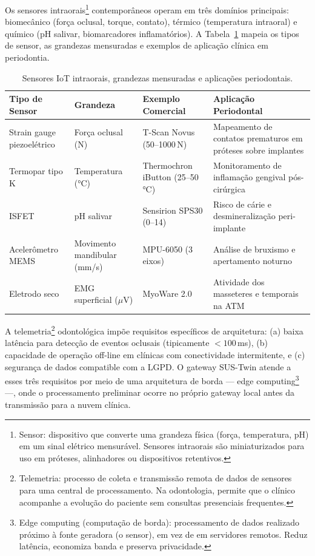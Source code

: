 Os sensores intraorais\footnote{Sensor: dispositivo que converte uma grandeza física (força, temperatura, pH) em um sinal elétrico mensurável. Sensores intraorais são miniaturizados para uso em próteses, alinhadores ou dispositivos retentivos.} contemporâneos operam em três domínios principais: biomecânico (força oclusal, torque, contato), térmico (temperatura intraoral) e químico (pH salivar, biomarcadores inflamatórios). A Tabela~\ref{tab:sensores-grandezas} mapeia os tipos de sensor, as grandezas mensuradas e exemplos de aplicação clínica em periodontia.

\begin{table}[hbt!]
\centering
\caption{Sensores IoT intraorais, grandezas mensuradas e aplicações periodontais.}
\label{tab:sensores-grandezas}
\small
\begin{tabular}{lllp{5.5cm}}
\toprule
\textbf{Tipo de Sensor} & \textbf{Grandeza} & \textbf{Exemplo Comercial} & \textbf{Aplicação Periodontal} \\
\midrule
Strain gauge piezoelétrico & Força oclusal (N) & T-Scan Novus (50--1000\,N) & Mapeamento de contatos prematuros em próteses sobre implantes \\
\addlinespace
Termopar tipo K & Temperatura (°C) & Thermochron iButton (25--50\,°C) & Monitoramento de inflamação gengival pós-cirúrgica \\
\addlinespace
ISFET & pH salivar & Sensirion SPS30 (0--14) & Risco de cárie e desmineralização peri-implante \\
\addlinespace
Acelerômetro MEMS & Movimento mandibular (mm/s) & MPU-6050 (3 eixos) & Análise de bruxismo e apertamento noturno \\
\addlinespace
Eletrodo seco & EMG superficial ($\mu$V) & MyoWare 2.0 & Atividade dos masseteres e temporais na ATM \\
\bottomrule
\end{tabular}
\end{table}

A telemetria\footnote{Telemetria: processo de coleta e transmissão remota de dados de sensores para uma central de processamento. Na odontologia, permite que o clínico acompanhe a evolução do paciente sem consultas presenciais frequentes.} odontológica impõe requisitos específicos de arquitetura: (a) baixa latência para detecção de eventos oclusais (tipicamente $<100$\,ms), (b) capacidade de operação off-line em clínicas com conectividade intermitente, e (c) segurança de dados compatible com a LGPD. O gateway SUS-Twin atende a esses três requisitos por meio de uma arquitetura de borda --- edge computing\footnote{Edge computing (computação de borda): processamento de dados realizado próximo à fonte geradora (o sensor), em vez de em servidores remotos. Reduz latência, economiza banda e preserva privacidade.} ---, onde o processamento preliminar ocorre no próprio gateway local antes da transmissão para a nuvem clínica.

